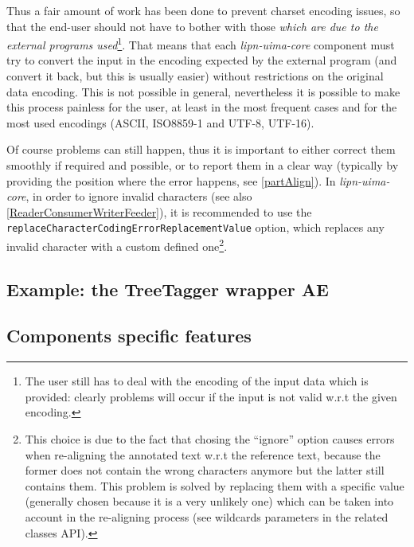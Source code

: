 \documentclass{article}
\newcommand{\todo}[1]{{\large \sf [TODO #1]}}
\newcommand{\uimaModule}{{\em lipn-uima-core}\xspace}
\begin{document}
Thus a fair amount of work has been done to prevent charset encoding issues, so that the end-user should not have to bother with those {\em which are due to the external programs used}\footnote{The user still has to deal with the encoding of the input data which is provided: clearly problems will occur if the input is not valid w.r.t the given encoding.}. That means that each \uimaModule component must try to convert the input in the encoding expected by the external program (and convert it back, but this is usually easier) without restrictions on the original data encoding. This is not possible in general, nevertheless it is possible to make this process painless for the user, at least in the most frequent cases and for the most used encodings (ASCII, ISO8859-1 and UTF-8, UTF-16). 

Of course problems can still happen, thus it is important to either correct them smoothly if required and possible, or to report them in a clear way (typically by providing the position where the error happens, see \ref{partAlign}). In \uimaModule, in order to ignore invalid characters (see also \ref{ReaderConsumerWriterFeeder}), it is recommended to use the {\tt replaceCharacterCodingErrorReplacementValue} option, which replaces any invalid character with a custom defined one\footnote{This choice is due to the fact that chosing the ``ignore'' option causes errors when re-aligning the annotated text w.r.t the reference text, because the former does not contain the wrong characters anymore but the latter still contains them. This problem is solved by replacing them with a specific value (generally chosen because it is a very unlikely one) which can be taken into account in the re-aligning process (see wildcards parameters in the related classes API).}.


\subsection{Example: the TreeTagger wrapper AE}
\todo{...}


\subsection{Components specific features}
\end{document}
